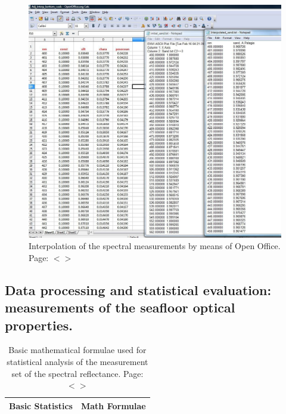 \documentclass[11pt]{article}
\begin{document}
\begin{appendices}
\begin{figure}[H]
	\begin{center}
		\includegraphics[scale=0.35]{Interpolation.jpg}
		\caption{Interpolation of the spectral measurements by means of Open Office. Page: $<$\pageref{page-28}$>$}
		\label{fig:A.10}
	\end{center}
\end{figure}
\pagebreak

\subsection[Data processing and statistical evaluation]{Data processing and statistical evaluation: measurements of the seafloor optical properties.}

\begin{table}[htbp]
	\caption{Basic mathematical formulae used for statistical analysis of the measurement set of the spectral reflectance. Page: $<$\pageref{page-41}$>$}
	\label{tab:13}
	\begin{center}
	\begin{tabular}{|c|c|}
		\hline\hline
		Basic Statistics & Math Formulae \\ \hline\hline
		\hline
		

\end{tabular}
\end{center}
\end{table}
\end{appendices}
\end{document}
